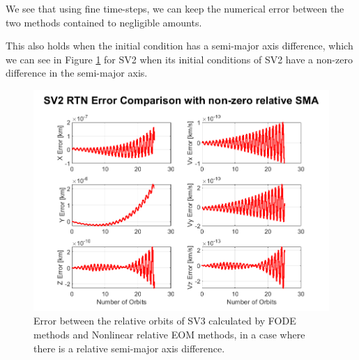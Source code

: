 We see that using fine time-steps, we can keep the numerical error between the two methods contained to negligible amounts.

This also holds when the initial condition has a semi-major axis difference, which we can see in Figure \ref{fig:error_in_SV2_rel_nonzero_a} for SV2 when its initial conditions of SV2 have a non-zero difference in the semi-major axis. 

\begin{figure}[H]
    \centering
    \includegraphics[width=0.5\linewidth]{sim/figures/SV2_error_in_rel_methods_nonzero_a.png}
    \caption{Error between the relative orbits of SV3 calculated by FODE methods and Nonlinear relative EOM methods, in a case where there is a relative semi-major axis difference.}
    \label{fig:error_in_SV2_rel_nonzero_a}
\end{figure}

